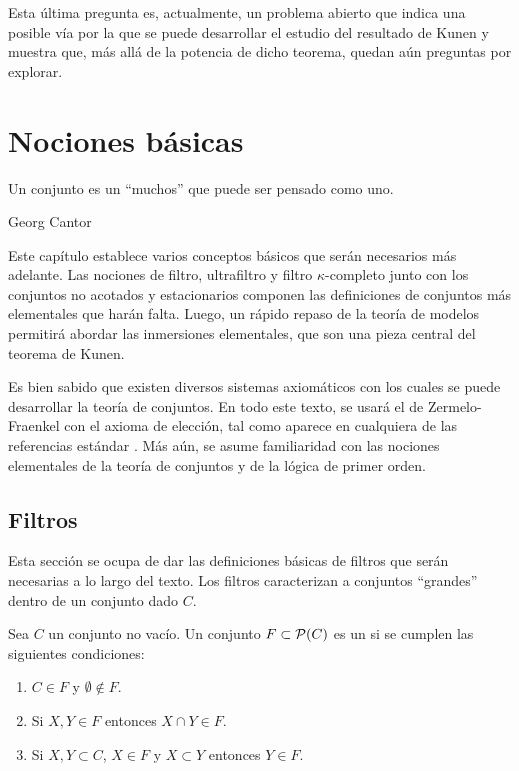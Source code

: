 Esta última pregunta es, actualmente, un problema abierto
que indica una posible vía por la que se puede desarrollar
el estudio del resultado de Kunen y muestra que, más allá
de la potencia de dicho teorema, quedan aún preguntas por explorar.

\fi
\ifbasicos
\chapter{Nociones básicas}
\thispagestyle{empty}

\epigraph
{
    Un conjunto es un “muchos” que puede ser pensado como uno.
}
{Georg Cantor \autocite[3]{ivorra_teoria_2022}}

Este capítulo establece varios conceptos básicos que serán necesarios
más adelante. Las nociones de filtro, ultrafiltro y filtro $\kappa$-completo
junto con los conjuntos no acotados y estacionarios componen las definiciones de
conjuntos más elementales que harán falta.
Luego, un rápido repaso de la teoría de modelos permitirá abordar las inmersiones
elementales, que son una pieza central del teorema de Kunen.

Es bien sabido que existen diversos sistemas axiomáticos
con los cuales se puede desarrollar la teoría de conjuntos.
En todo este texto, se usará el de Zermelo-Fraenkel con el axioma de elección, tal como
aparece en cualquiera de las referencias estándar \autocite{kunen_set_2013,jech_set_2003}.
Más aún, se asume familiaridad con las nociones elementales de la teoría de conjuntos
y de la lógica de primer orden.

\section{Filtros}

Esta sección se ocupa de dar las definiciones básicas de filtros
que serán necesarias a lo largo del texto.
Los filtros caracterizan a conjuntos ``grandes'' dentro
de un conjunto dado $C$.

\begin{defi}
    Sea $C$ un conjunto no vacío. Un conjunto $F\subset \pwset{C}$ es un
     si se cumplen las siguientes condiciones:
    \begin{enumerate}[label=(\roman*)]
        \item $C\in F$ y $\emptyset\notin F$.
        \item Si $X,Y\in F$ entonces $X\cap Y\in F$.
        \item Si $X,Y\subset C$, $X\in F$ y $X\subset Y$ entonces $Y\in F$.
    \end{enumerate}
\end{defi}

